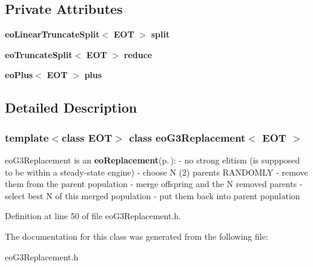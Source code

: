 \subsection*{Private Attributes}
\begin{CompactItemize}
\item 
{\bf eo\-Linear\-Truncate\-Split}$<$ {\bf EOT} $>$ {\bf split}\label{classeo_g3_replacement_r0}

\item 
{\bf eo\-Truncate\-Split}$<$ {\bf EOT} $>$ {\bf reduce}\label{classeo_g3_replacement_r1}

\item 
{\bf eo\-Plus}$<$ {\bf EOT} $>$ {\bf plus}\label{classeo_g3_replacement_r2}

\end{CompactItemize}


\subsection{Detailed Description}
\subsubsection*{template$<$class EOT$>$ class eo\-G3Replacement$<$ EOT $>$}

eo\-G3Replacement is an {\bf eo\-Replacement}{\rm (p.\,\pageref{classeo_replacement})}: - no strong elitism (is suppposed to be within a steady-state engine) - choose N (2) parents RANDOMLY - remove them from the parent population - merge offspring and the N removed parents - select best N of this merged population - put them back into parent population 



Definition at line 50 of file eo\-G3Replacement.h.

The documentation for this class was generated from the following file:\begin{CompactItemize}
\item 
eo\-G3Replacement.h\end{CompactItemize}
